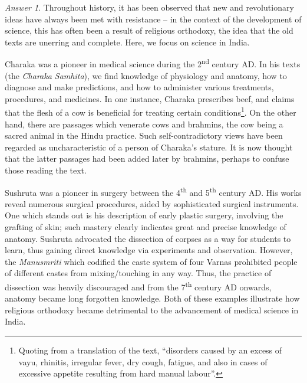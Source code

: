 \documentclass[11pt]{article}
\theoremstyle{remark}
\newtheorem*{answer}{Answer}
\begin{document}
    \begin{answer}
        Throughout history, it has been observed that new and revolutionary ideas
        have always been met with resistance -- in the context of the development of
        science, this has often been a result of religious orthodoxy, the idea that
        the old texts are unerring and complete. Here, we focus on science in India.

        Charaka was a pioneer in medical science during the 2\textsuperscript{nd}
        century AD. In his texts (the \emph{Charaka Samhita}), we find knowledge of
        physiology and anatomy, how to diagnose and make predictions, and how to
        administer various treatments, procedures, and medicines. In one instance,
        Charaka prescribes beef, and claims that the flesh of a cow is beneficial
        for treating certain conditions\footnote{Quoting from a translation of the
        text, ``disorders caused by an excess of vayu, rhinitis, irregular fever, dry
        cough, fatigue, and also in cases of excessive appetite resulting from hard
        manual labour''.}. On the other hand, there are passages which venerate cows
        and brahmins, the cow being a sacred animal in the Hindu practice. Such
        self-contradictory views have been regarded as uncharacteristic of a person
        of Charaka's stature. It is now thought that the latter passages had been
        added later by brahmins, perhaps to confuse those reading the text.

        Sushruta was a pioneer in surgery between the 4\textsuperscript{th} and
        5\textsuperscript{th} century AD. His works reveal numerous surgical
        procedures, aided by sophisticated surgical instruments. One which stands out
        is his description of early plastic surgery, involving the grafting of skin;
        such mastery clearly indicates great and precise knowledge of anatomy.
        Sushruta advocated the dissection of corpses as a way for students to learn,
        thus gaining direct knowledge via experiments and observation. However, the
        \emph{Manusmriti} which codified the caste system of four Varnas prohibited
        people of different castes from mixing/touching in any way. Thus, the
        practice of dissection was heavily discouraged and from the
        7\textsuperscript{th} century AD onwards, anatomy became long forgotten
        knowledge. Both of these examples illustrate how religious orthodoxy became
        detrimental to the advancement of medical science in India.


\end{answer}
\end{document}
